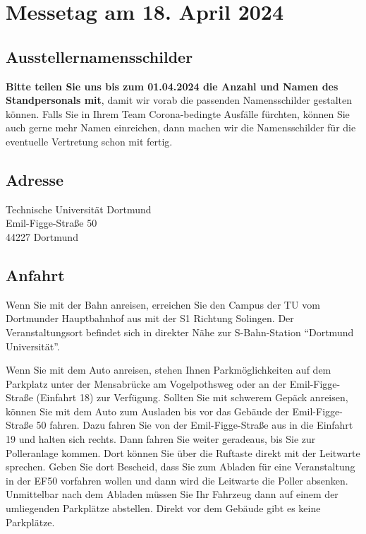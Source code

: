 \documentclass[
  paper=a4,
  fontsize=12pt,
  DIV=16,
  headheight=30pt,
  footheight=45pt,
  headinclude,
  parskip=half,
]{scrartcl}
\begin{document}
\section*{Messetag am 18. April 2024}

\subsection*{Ausstellernamensschilder}

\textbf{Bitte teilen Sie uns bis zum 01.04.2024 die Anzahl und Namen des Standpersonals mit}, damit wir vorab die passenden Namensschilder gestalten können.
Falls Sie in Ihrem Team Corona-bedingte Ausfälle fürchten, können Sie auch gerne mehr Namen einreichen, dann machen wir die Namensschilder für die eventuelle Vertretung schon mit fertig.

\subsection*{Adresse}

Technische Universität Dortmund\\
Emil-Figge-Straße 50\\
44227 Dortmund

\subsection*{Anfahrt}

Wenn Sie mit der Bahn anreisen, erreichen Sie den Campus der TU vom Dortmunder Hauptbahnhof aus mit der S1 Richtung Solingen.
Der Veranstaltungsort befindet sich in direkter Nähe zur S-Bahn-Station \enquote{Dortmund Universität}.

Wenn Sie mit dem Auto anreisen, stehen Ihnen Parkmöglichkeiten auf dem Parkplatz unter der Mensabrücke am Vogelpothsweg oder an der Emil-Figge-Straße (Einfahrt 18) zur Verfügung.
Sollten Sie mit schwerem Gepäck anreisen, können Sie mit dem Auto zum Ausladen bis vor das Gebäude der Emil-Figge-Straße 50 fahren.
Dazu fahren Sie von der Emil-Figge-Straße aus in die Einfahrt 19 und halten sich rechts.
Dann fahren Sie weiter geradeaus, bis Sie zur Polleranlage kommen.
Dort können Sie über die Ruftaste direkt mit der Leitwarte sprechen.
Geben Sie dort Bescheid, dass Sie zum Abladen für eine Veranstaltung in der EF50 vorfahren wollen und dann wird die Leitwarte die Poller absenken.
Unmittelbar nach dem Abladen müssen Sie Ihr Fahrzeug dann auf einem der umliegenden Parkplätze abstellen.
Direkt vor dem Gebäude gibt es keine Parkplätze.
\end{document}
